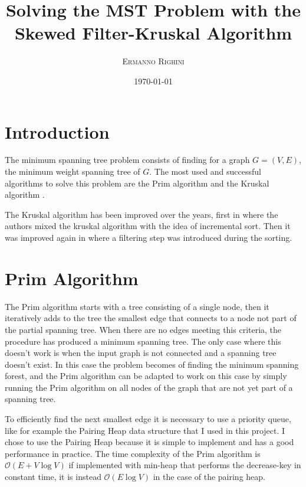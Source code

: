 \documentclass{article}
\title{Solving the MST Problem with the Skewed Filter-Kruskal Algorithm} %
\author{%
\textsc{Ermanno Righini}%
\\[1ex] %
}
\date{\today} %
\begin{document}
\maketitle


\section{Introduction}

The minimum spanning tree problem consists of finding for a graph $G=(V,E)$, the minimum weight spanning tree of $G$.
The most used and successful algorithms to solve this problem are the Prim algorithm \cite{prim} and the Kruskal algorithm \cite{kruskal}.

The Kruskal algorithm has been improved over the years, first in \cite{incremental} where the authors mixed the kruskal algorithm with the idea of incremental sort. Then it was improved again in \cite{filterkruskal} where a filtering step was introduced during the sorting.

\section{Prim Algorithm}

The Prim algorithm starts with a tree consisting of a single node, then it iteratively adds to the tree the smallest edge that connects to a node not part of the partial spanning tree. When there are no edges meeting this criteria, the procedure has produced a minimum spanning tree. The only case where this doesn't work is when the input graph is not connected and a spanning tree doesn't exist. In this case the problem becomes of finding the minimum spanning forest, and the Prim algorithm can be adapted to work on this case by simply running the Prim algorithm on all nodes of the graph that are not yet part of a spanning tree.

To efficiently find the next smallest edge it is necessary to use a priority queue, like for example the Pairing Heap data structure \cite{pairing} that I used in this project. I chose to use the Pairing Heap because it is simple to implement and has a good performance in practice.
The time complexity of the Prim algorithm is $\mathcal{O}(E + V\log V)$ if implemented with min-heap that performs the decrease-key in constant time, it is instead $\mathcal{O}(E\log V)$ in the case of the pairing heap.
\end{document}
